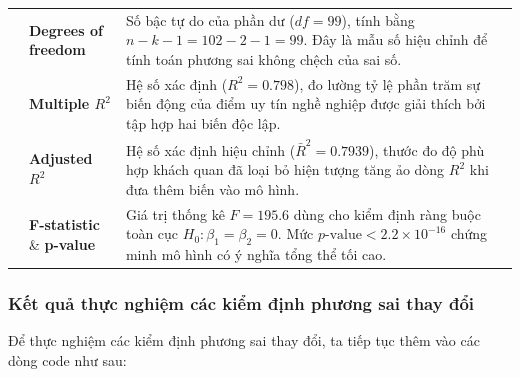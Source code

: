 \documentclass[12pt, a4paper]{article}
\begin{document}
\begin{table}[H]
\begin{tabularx}{\textwidth}{l p{3.2cm} X}
			\addlinespace
			& \textbf{Degrees of freedom} & Số bậc tự do của phần dư ($df = 99$), tính bằng $n - k - 1 = 102 - 2 - 1 = 99$. Đây là mẫu số hiệu chỉnh để tính toán phương sai không chệch của sai số. \\
			\addlinespace
			& \textbf{Multiple $R^2$} & Hệ số xác định ($R^2 = 0.798$), đo lường tỷ lệ phần trăm sự biến động của điểm uy tín nghề nghiệp được giải thích bởi tập hợp hai biến độc lập. \\
			\addlinespace
			& \textbf{Adjusted $R^2$} & Hệ số xác định hiệu chỉnh ($\bar{R}^2 = 0.7939$), thước đo độ phù hợp khách quan đã loại bỏ hiện tượng tăng ảo dòng $R^2$ khi đưa thêm biến vào mô hình. \\
			\addlinespace
			& \textbf{F-statistic} \& \textbf{p-value} & Giá trị thống kê $F = 195.6$ dùng cho kiểm định ràng buộc toàn cục $H_0: \beta_1 = \beta_2 = 0$. Mức $p\text{-value} < 2.2 \times 10^{-16}$ chứng minh mô hình có ý nghĩa tổng thể tối cao. \\
			\bottomrule
		\end{tabularx}
	\end{table}
	\subsubsection{Kết quả thực nghiệm các kiểm định phương sai thay đổi}
	Để thực nghiệm các kiểm định phương sai thay đổi, ta tiếp tục thêm vào các dòng code như sau:\\
    \noindent{}
\end{document}
